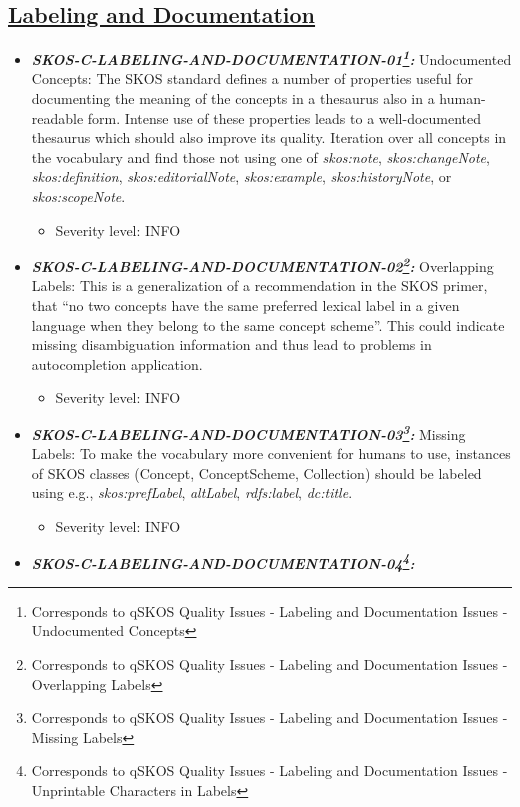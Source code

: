 \documentclass{llncs}
\begin{document}
\subsection{\underline{Labeling and Documentation}}

\begin{itemize}
	\item \textbf{{\em SKOS-C-LABELING-AND-DOCUMENTATION-01\footnote{Corresponds to qSKOS Quality Issues - Labeling and Documentation Issues - Undocumented Concepts}:}}
	Undocumented Concepts:
  The SKOS standard defines a number of properties useful for documenting the meaning of the concepts in a thesaurus also in a human-readable form. Intense use of these properties leads to a well-documented thesaurus which should also improve its quality.  
	Iteration over all concepts in the vocabulary and find those not using one of \emph{skos:note}, \emph{skos:changeNote}, \emph{skos:definition}, \emph{skos:editorialNote}, \emph{skos:example}, \emph{skos:historyNote}, or \emph{skos:scopeNote}.
	\begin{itemize}
		\item Severity level: INFO
	\end{itemize}
	\item \textbf{{\em SKOS-C-LABELING-AND-DOCUMENTATION-02\footnote{Corresponds to qSKOS Quality Issues - Labeling and Documentation Issues - Overlapping Labels}:}}
	Overlapping Labels:
	This is a generalization of a recommendation in the SKOS primer, that “no two concepts have the same preferred lexical label in a given language when they belong to the same concept scheme”. This could indicate missing disambiguation information and thus lead to problems in autocompletion application. 
	\begin{itemize}
		\item Severity level: INFO
	\end{itemize}
	\item \textbf{{\em SKOS-C-LABELING-AND-DOCUMENTATION-03\footnote{Corresponds to qSKOS Quality Issues - Labeling and Documentation Issues - Missing Labels}:}}
	Missing Labels:
	To make the vocabulary more convenient for humans to use, instances of SKOS classes (Concept, ConceptScheme, Collection) should be labeled using e.g., \emph{skos:prefLabel}, \emph{altLabel}, \emph{rdfs:label}, \emph{dc:title}. 
	\begin{itemize}
		\item Severity level: INFO
	\end{itemize}
	\item \textbf{{\em SKOS-C-LABELING-AND-DOCUMENTATION-04\footnote{Corresponds to qSKOS Quality Issues - Labeling and Documentation Issues - Unprintable Characters in Labels}:}}

\end{itemize}
\end{document}
